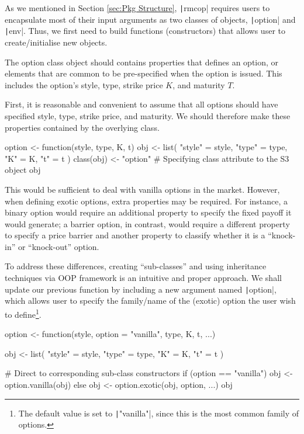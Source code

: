 As we mentioned in Section \ref{sec:Pkg Structure}, \texttt|rmcop| requires users to encapsulate most of their input arguments as two classes of objects, \texttt|option| and \texttt|env|. Thus, we first need to build functions (constructors) that allows user to create/initialise new objects.

The option class object should contains properties that defines an option, or elements that are common to be pre-specified when the option is issued. This includes the option's style, type, strike price $K$, and maturity $T$.

First, it is reasonable and convenient to assume that all options should have specified style, type, strike price, and maturity. We should therefore make these properties contained by the overlying class.

\begin{Rminted}
option <- function(style, type, K, t) {
    obj <- list(
        "style" = style,
        "type" = type,
        "K" = K,
        "t" = t
    )
    class(obj) <- "option" # Specifying class attribute to the S3 object
    obj
}
\end{Rminted}

This would be sufficient to deal with vanilla options in the market. However, when defining exotic options, extra properties may be required. For instance, a binary option would require an additional property to specify the fixed payoff it would generate; a barrier option, in contrast, would require a different property to specify a price barrier and another property to classify whether it is a ``knock-in'' or ``knock-out'' option.

To address these differences, creating ``sub-classes'' and using inheritance techniques via OOP framework is an intuitive and proper approach. We shall update our previous function by including a new argument named \texttt|option|, which allows user to specify the family/name of the (exotic) option the user wish to define\footnote{The default value is set to \texttt|"vanilla"|, since this is the most common family of options.}.

\begin{Rminted}
option <- function(style, option = "vanilla", type, K, t, ...) {

    obj <- list(
        "style" = style,
        "type" = type,
        "K" = K,
        "t" = t
    )

    # Direct to corresponding sub-class constructors
    if (option == "vanilla") {
        obj <- option.vanilla(obj)
    } else {
        obj <- option.exotic(obj, option, ...)
    }
    obj
}
\end{Rminted}

